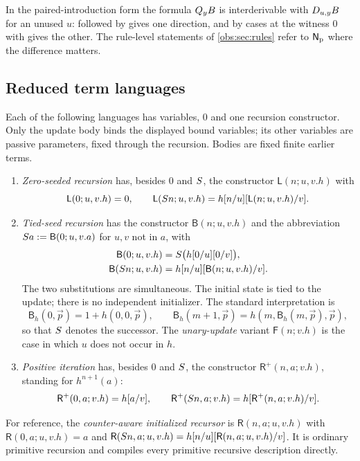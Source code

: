 In the paired-introduction form the formula $Q_{y}B$ is interderivable with
$D_{u,y}B$ for an unused $u$:  followed by  gives
one direction, and  by cases at the witness $0$ with 
gives the other. The rule-level statements of \cref{obs:sec:rules} refer to
$\mathsf{N}_{\mathrm{p}}$ where the difference matters.

\subsection{Reduced term languages}
\label{obs:sec:languages}

\begin{definition}
\label{obs:def:languages}
Each of the following languages has variables, $0$ and one recursion
constructor. Only the update body binds the displayed bound variables; its
other variables are passive parameters, fixed through the recursion. Bodies are
fixed finite earlier terms.
\begin{enumerate}[label=(\alph*)]
\item \emph{Zero-seeded recursion} has, besides $0$ and $S$, the
constructor $\mathsf{L}(n;u,v.h)$ with
\[
\mathsf{L}(0;u,v.h)=0,\qquad
\mathsf{L}(S n;u,v.h)=h[n/u][\mathsf{L}(n;u,v.h)/v].
\]
\item \emph{Tied-seed recursion} has the constructor $\mathsf{B}(n;u,v.h)$ and
the abbreviation $S a\mathrel{:=}\mathsf{B}(0;u,v.a)$ for $u,v$ not in $a$, with
\begin{align}
\mathsf{B}(0;u,v.h)&=S\bigl(h[0/u][0/v]\bigr),\label{obs:eq:B0}\\
\mathsf{B}(S n;u,v.h)&=h[n/u][\mathsf{B}(n;u,v.h)/v].\label{obs:eq:BS}
\end{align}
The two substitutions are simultaneous. The initial state is tied to the
update; there is no independent initializer. The standard interpretation is
\[
\mathsf{B}_h(0,\vec p)=1+h(0,0,\vec p),\qquad
\mathsf{B}_h(m+1,\vec p)=h(m,\mathsf{B}_h(m,\vec p),\vec p),
\]
so that $S$ denotes the successor. The \emph{unary-update} variant
$\mathsf{F}(n;v.h)$ is the case in which $u$ does not occur in $h$.
\item \emph{Positive iteration} has, besides $0$ and $S$, the constructor
$\mathsf{R}^{+}(n,a;v.h)$, standing for $h^{n+1}(a)$:
\[
\mathsf{R}^{+}(0,a;v.h)=h[a/v],\qquad
\mathsf{R}^{+}(S n,a;v.h)=h[\mathsf{R}^{+}(n,a;v.h)/v].
\]
\end{enumerate}
For reference, the \emph{counter-aware initialized recursor} is
$\mathsf{R}(n,a;u,v.h)$ with $\mathsf{R}(0,a;u,v.h)=a$ and
$\mathsf{R}(S n,a;u,v.h)=h[n/u][\mathsf{R}(n,a;u,v.h)/v]$. It
is ordinary primitive recursion and compiles every primitive recursive
description directly.
\end{definition}


